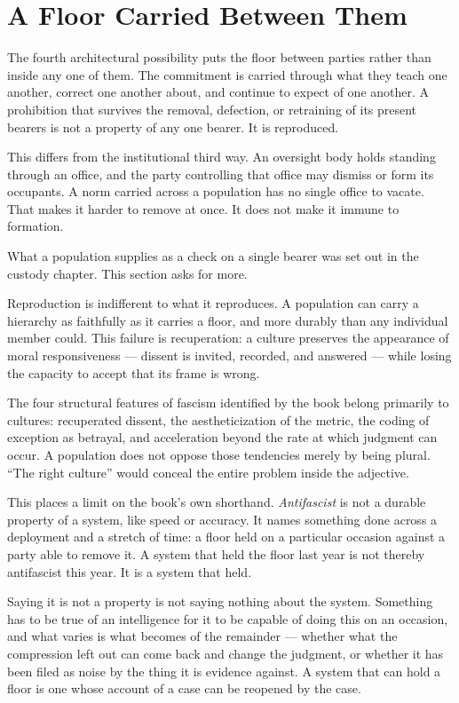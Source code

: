 \section{A Floor Carried Between Them}
\label{sec:3.8}
The fourth architectural possibility puts the floor between parties rather than inside any one of them. The commitment is carried through what they teach one another, correct one another about, and continue to expect of one another. A prohibition that survives the removal, defection, or retraining of its present bearers is not a property of any one bearer. It is reproduced.

This differs from the institutional third way. An oversight body holds standing through an office, and the party controlling that office may dismiss or form its occupants. A norm carried across a population has no single office to vacate. That makes it harder to remove at once. It does not make it immune to formation.

What a population supplies as a check on a single bearer was set out in
the custody chapter. This section asks for more.


Reproduction is indifferent to what it reproduces. A population can carry a hierarchy as faithfully as it carries a floor, and more durably than any individual member could. This failure is recuperation: a culture preserves the appearance of moral responsiveness — dissent is invited, recorded, and answered — while losing the capacity to accept that its frame is wrong.

The four structural features of fascism identified by the book belong primarily to cultures: recuperated dissent, the aestheticization of the metric, the coding of exception as betrayal, and acceleration beyond the rate at which judgment can occur. A population does not oppose those tendencies merely by being plural. “The right culture” would conceal the entire problem inside the adjective.

This places a limit on the book's own shorthand. \emph{Antifascist} is not a durable property of a system, like speed or accuracy. It names something done across a deployment and a stretch of time: a floor held on a particular occasion against a party able to remove it. A system that held the floor last year is not thereby antifascist this year. It is a system that held.

Saying it is not a property is not saying nothing about the system. Something has to be true of an intelligence for it to be capable of doing this on an occasion, and what varies is what becomes of the remainder — whether what the compression left out can come back and change the judgment, or whether it has been filed as noise by the thing it is evidence against. A system that can hold a floor is one whose account of a case can be reopened by the case.


